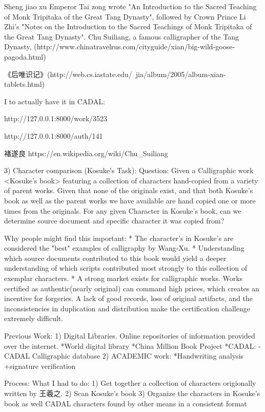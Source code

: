 Sheng jiao xu
 Emperor Tai zong wrote "An Introduction to the Sacred Teaching of Monk Tripitaka of the Great Tang Dynasty", followed by Crown Prince Li Zhi's "Notes on the Introduction to the Sacred Teachings of Monk Tripitaka of the Great Tang Dynasty". Chu Suiliang, a famous calligrapher of the Tang Dynasty, (http://www.chinatravelrus.com/cityguide/xian/big-wild-goose-pagoda.html)

《后唯识记》(http://web.cs.iastate.edu/~jia/album/2005/album-xian-tablets.html)



I to actually have it in CADAL:

http://127.0.0.1:8000/work/3523

http://127.0.0.1:8000/auth/141

褚遂良
https://en.wikipedia.org/wiki/Chu_Suiliang



3)  Character comparison (Kosuke's Task):
    Question:   Given a Calligraphic work <Kosuke's book> featuring a collection of characters hand-copied from a variety of parent works.
                Given that none of the originals exist, and that both Kosuke's book as well as the parent works we have available are hand copied one or more times from the originals.
                For any given Character in Kosuke's book, can we determine source document and specific character it was copied from?
                
Why people might find this important:
    *  The character's in Kosuke's are considered the "best" examples of calligraphy by Wang-Xu.
    *  Understanding which source documents contributed to this book would yield a deeper understanding of which scripts contributed most strongly to this collection of exemplar characters.
    *  A strong market exists for calligraphic works.  Works certified as authentic(nearly original) can command high prices, which creates an incentive for forgeries.  A lack of good records, loss of original artifacts, and the inconsistencies in duplication and distribution make the certification challenge extremely difficult.
    
Previous Work:
    1) Digital Libraries.  Online repositories of information provided over the internet.
        *World digital library
        *China Million Book Project
            *CADAL:
                -CADAL Calligraphic database
    2) ACADEMIC work:
        *Handwriting analysis
            +signature verification
            

Process:  What I had to do:
    1)  Get together a collection of characters origionally written by 王羲之.
    2)  Scan Kosuke's book
    3)  Organize the characters in Kosuke's book as well CADAL characters found by other means in a consistent format
    
